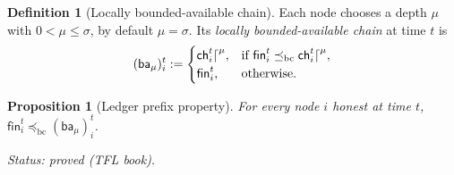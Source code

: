 \documentclass[11pt,a4paper]{article}
\newtheorem{proposition}[theorem]{Proposition}
\theoremstyle{definition}
\newtheorem{definition}[theorem]{Definition}
\newcommand{\bc}{\mathrm{bc}}
\newcommand{\preceqbc}{\preceq_{\bc}}
\newcommand{\ch}{\mathsf{ch}}
\newcommand{\fin}{\mathsf{fin}}
\newcommand{\ba}{\mathsf{ba}}
\begin{document}
\begin{definition}[Locally bounded-available chain]\label{def:ba}
Each node chooses a depth $\mu$ with $0 < \mu \le \sigma$, by default $\mu =
\sigma$. Its \emph{locally bounded-available chain} at time $t$ is
\[
  (\ba_\mu)_i^t :=
  \begin{cases}
    \ch_i^t\trunc{\mu}, & \text{if } \fin_i^t \preceqbc \ch_i^t\trunc{\mu},\\
    \fin_i^t, & \text{otherwise}.
  \end{cases}
\]
\end{definition}

\begin{proposition}[Ledger prefix property]\label{prop:ledger-prefix}
For every node $i$ honest at time $t$, $\fin_i^t \preceqbc (\ba_\mu)_i^t$.

Status: proved (TFL book).
\end{proposition}
\end{document}

